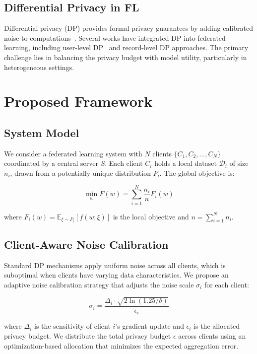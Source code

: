 \documentclass[conference]{IEEEtran}
\begin{document}
\subsection{Differential Privacy in FL}

Differential privacy (DP) provides formal privacy guarantees by adding calibrated noise to computations~\cite{dwork2014algorithmic}. Several works have integrated DP into federated learning, including user-level DP~\cite{mcmahan2018learning} and record-level DP approaches. The primary challenge lies in balancing the privacy budget with model utility, particularly in heterogeneous settings.

\section{Proposed Framework}

\subsection{System Model}

We consider a federated learning system with $N$ clients $\{C_1, C_2, \ldots, C_N\}$ coordinated by a central server $S$. Each client $C_i$ holds a local dataset $\mathcal{D}_i$ of size $n_i$, drawn from a potentially unique distribution $P_i$. The global objective is:

\begin{equation}
\min_{w} F(w) = \sum_{i=1}^{N} \frac{n_i}{n} F_i(w)
\end{equation}

where $F_i(w) = \mathbb{E}_{\xi \sim P_i}[f(w; \xi)]$ is the local objective and $n = \sum_{i=1}^{N} n_i$.

\subsection{Client-Aware Noise Calibration}

Standard DP mechanisms apply uniform noise across all clients, which is suboptimal when clients have varying data characteristics. We propose an adaptive noise calibration strategy that adjusts the noise scale $\sigma_i$ for each client:

\begin{equation}
\sigma_i = \frac{\Delta_i \cdot \sqrt{2 \ln(1.25/\delta)}}{\epsilon_i}
\end{equation}

where $\Delta_i$ is the sensitivity of client $i$'s gradient update and $\epsilon_i$ is the allocated privacy budget. We distribute the total privacy budget $\epsilon$ across clients using an optimization-based allocation that minimizes the expected aggregation error.
\end{document}
